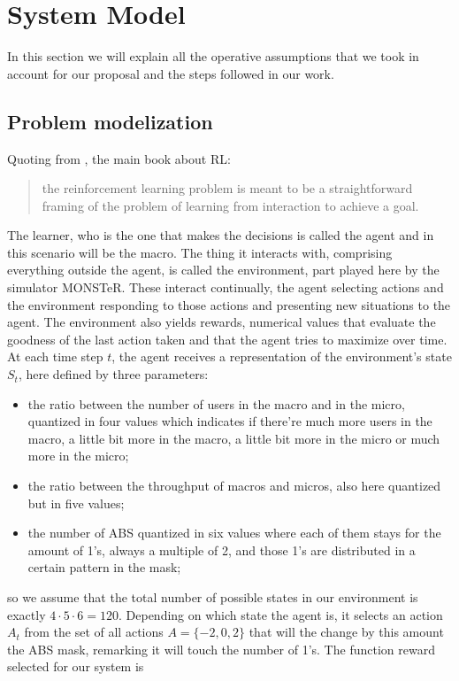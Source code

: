 \documentclass[conference,10pt]{IEEEtran}
\begin{document}
\section{System Model}\label{sec:symo}
In this section we will explain all the operative assumptions that we took in account for our proposal and the steps followed in our work.
\subsection{Problem modelization}
Quoting from \cite{sutton1998reinforcement}, the main book about RL: 
\begin{quote}
the reinforcement learning problem is meant to be a straightforward framing of the problem of learning from interaction to achieve a goal.
\end{quote}
The learner, who is the one that makes the decisions is called the agent and in this scenario will be the macro. The thing it interacts with, comprising everything outside the agent, is called the environment, part played here by the simulator MONSTeR. These interact continually, the agent selecting actions and the environment responding to those actions and presenting new situations to the agent. The environment also yields rewards, numerical values that evaluate the goodness of the last action taken and that the agent tries to maximize over time. At each time step $t$, the agent receives a representation of the environment’s state $S_t$, here defined by three parameters:
\begin{itemize}
\item the ratio between the number of users in the macro and in the micro, quantized in four values which indicates if there're much more users in the macro, a little bit more in the macro, a little bit more in the micro or much more in the micro;
\item the ratio between the throughput of macros and micros, also here quantized but in five values;
\item the number of ABS quantized in six values where each of them stays for the amount of 1's, always a multiple of 2, and those 1's are distributed in a certain pattern in the mask;    
\end{itemize}
so we assume that the total number of possible states in our environment is exactly $4\cdot 5\cdot 6=120$. Depending on which state the agent is, it selects an action $A_t$ from the set of all actions $A=\lbrace-2,0,2\rbrace$ that will the change by this amount the ABS mask, remarking it will touch the number of 1's.  The function reward selected for our system is 
\end{document}
